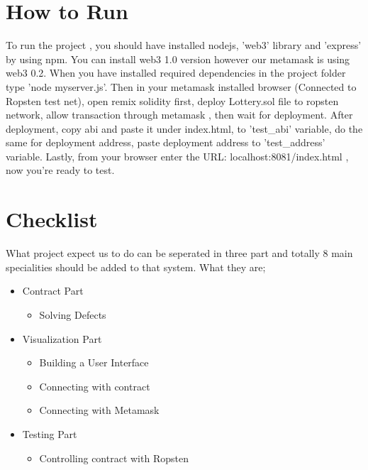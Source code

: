 \documentclass[]{scrreprt}
\begin{document}
\section{How to Run}
To run the project , you should have installed nodejs, 'web3' library and 'express' by using npm. You can install web3 1.0 version however our metamask is using web3 0.2. When you have installed required dependencies in the project folder type 'node myserver.js'. Then in your metamask installed browser (Connected to Ropsten test net), open remix solidity first, deploy Lottery.sol file to ropsten network, allow transaction through metamask , then wait for deployment. After deployment, copy abi and paste it under index.html, to 'test_abi' variable, do the same for deployment address, paste deployment address to 'test_address' variable. 
Lastly, from your browser enter the URL: localhost:8081/index.html , now you're ready to test.

\section{Checklist}
What project expect us to do can be seperated in three part and totally 8 main specialities should be added to that system. What they are;
\begin{itemize}
	\item 
	Contract Part
	\begin{itemize}
		\item 
		Solving Defects
	\end{itemize}
	\item 
	Visualization Part
	\begin{itemize}
		\item 
		Building a User Interface
		\item 
		Connecting with contract
		\item 
		Connecting with Metamask
	\end{itemize}
	\item 
	Testing Part
	\begin{itemize}
		\item 
		Controlling contract with Ropsten
	\end{itemize}
\end{itemize}
\end{document}
